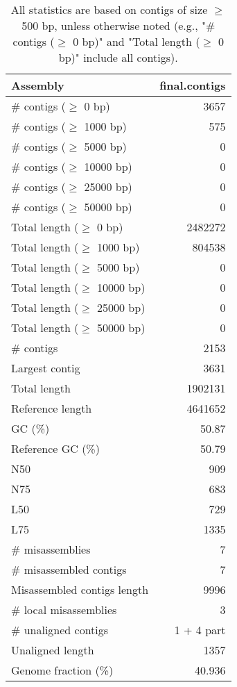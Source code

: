 \documentclass[12pt,a4paper]{article}
\begin{document}
\begin{table}[ht]
\begin{center}
\caption{All statistics are based on contigs of size $\geq$ 500 bp, unless otherwise noted (e.g., "\# contigs ($\geq$ 0 bp)" and "Total length ($\geq$ 0 bp)" include all contigs).}
\begin{tabular}{|l*{1}{|r}|}
\hline
Assembly & final.contigs \\ \hline
\# contigs ($\geq$ 0 bp) & 3657 \\ \hline
\# contigs ($\geq$ 1000 bp) & 575 \\ \hline
\# contigs ($\geq$ 5000 bp) & 0 \\ \hline
\# contigs ($\geq$ 10000 bp) & 0 \\ \hline
\# contigs ($\geq$ 25000 bp) & 0 \\ \hline
\# contigs ($\geq$ 50000 bp) & 0 \\ \hline
Total length ($\geq$ 0 bp) & 2482272 \\ \hline
Total length ($\geq$ 1000 bp) & 804538 \\ \hline
Total length ($\geq$ 5000 bp) & 0 \\ \hline
Total length ($\geq$ 10000 bp) & 0 \\ \hline
Total length ($\geq$ 25000 bp) & 0 \\ \hline
Total length ($\geq$ 50000 bp) & 0 \\ \hline
\# contigs & 2153 \\ \hline
Largest contig & 3631 \\ \hline
Total length & 1902131 \\ \hline
Reference length & 4641652 \\ \hline
GC (\%) & 50.87 \\ \hline
Reference GC (\%) & 50.79 \\ \hline
N50 & 909 \\ \hline
N75 & 683 \\ \hline
L50 & 729 \\ \hline
L75 & 1335 \\ \hline
\# misassemblies & 7 \\ \hline
\# misassembled contigs & 7 \\ \hline
Misassembled contigs length & 9996 \\ \hline
\# local misassemblies & 3 \\ \hline
\# unaligned contigs & 1 + 4 part \\ \hline
Unaligned length & 1357 \\ \hline
Genome fraction (\%) & 40.936 \\ \hline

\end{tabular}
\end{center}
\end{table}
\end{document}
